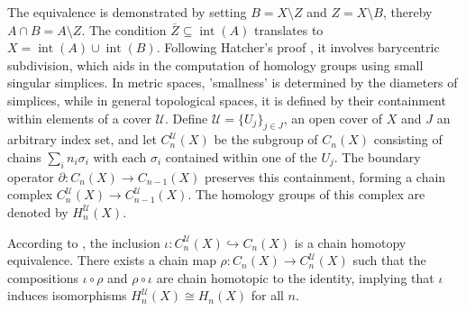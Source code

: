 The equivalence is demonstrated by setting \( B = X \setminus Z \) and \( Z = X \setminus B \), thereby \( A \cap B = A \setminus Z \). The condition \( \overline{Z} \subseteq \operatorname{int}(A) \) translates to \( X = \operatorname{int}(A) \cup \operatorname{int}(B) \). Following Hatcher's proof \cite[§2.20]{hatcher2005algebraic}, it involves barycentric subdivision, which aids in the computation of homology groups using small singular simplices. In metric spaces, 'smallness' is determined by the diameters of simplices, while in general topological spaces, it is defined by their containment within elements of a cover \( \mathcal{U} \). Define \( \mathcal{U} = \{U_{j}\}_{j \in J} \), an open cover of \( X \) and $J$ an arbitrary index set, and let \( C^{\mathcal{U}}_{n}(X) \) be the subgroup of \( C_{n}(X) \) consisting of chains \( \sum_{i} n_{i} \sigma_{i} \) with each \( \sigma_{i} \) contained within one of the \( U_{j} \). The boundary operator \( \partial: C_{n}(X) \to C_{n-1}(X) \) preserves this containment, forming a chain complex \( C^{\mathcal{U}}_{n}(X) \to C^{\mathcal{U}}_{n-1}(X) \). The homology groups of this complex are denoted by \( H^{\mathcal{U}}_{n}(X) \).

\begin{proposition}
According to \cite[\S 2.21]{hatcher2005algebraic}, the inclusion \( \iota : C^{\mathcal{U}}_n(X) \hookrightarrow C_n(X) \) is a chain homotopy equivalence. There exists a chain map \( \rho : C_n(X) \to C^{\mathcal{U}}_n(X) \) such that the compositions \( \iota \circ \rho \) and \( \rho \circ \iota \) are chain homotopic to the identity, implying that \( \iota \) induces isomorphisms \( H^{\mathcal{U}}_n(X) \cong H_n(X) \) for all \( n \).
\end{proposition}

